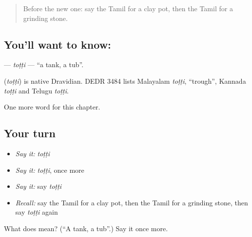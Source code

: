 \label{lesson:TA-C190-totti}



\begin{quote}
Before the new one: say the Tamil for a clay pot, then the Tamil for a grinding stone.
\end{quote}

\subsection*{You'll want to know: }
\textbf{} — \emph{toṭṭi} — \textquotedblleft{}a tank, a tub\textquotedblright{}.

\begin{cousinweb}
\textbf{} (\emph{toṭṭi}) is native Dravidian. DEDR 3484 lists Malayalam \emph{toṭṭi}, \textquotedblleft{}trough\textquotedblright{}, Kannada \emph{toṭṭi} and Telugu \emph{toṭṭi}.
\end{cousinweb}

\begin{grammarlens}[title={What you've built}]
One more word for this chapter.
\end{grammarlens}

\subsection*{Your turn}
\begin{itemize}
\raggedright
  \item \emph{Say it:} \emph{toṭṭi}
  \item \emph{Say it:} \emph{toṭṭi}, once more
  \item \emph{Say it:} say \emph{toṭṭi}
  \item \emph{Recall:} say the Tamil for a clay pot, then the Tamil for a grinding stone, then say \emph{toṭṭi} again
\end{itemize}

\begin{tcolorbox}[breakable,colback=teal!4,colframe=teal!35!black,title={Before you move on}]
What does  mean? (\textquotedblleft{}A tank, a tub\textquotedblright{}.) Say it once more.
\end{tcolorbox}
